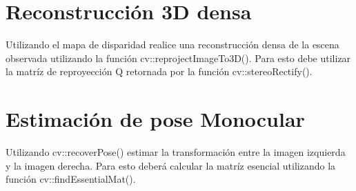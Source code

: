 \documentclass[tp]{lcc}
\begin{document}
\section{Reconstrucción 3D densa}
Utilizando el mapa de disparidad realice una reconstrucción densa de la escena observada utilizando la función cv::reprojectImageTo3D(). Para esto debe utilizar la matríz de reproyección Q retornada por la función cv::stereoRectify().

\section{Estimación de pose Monocular}
Utilizando cv::recoverPose() estimar la transformación entre la imagen izquierda y la imagen derecha. Para esto deberá calcular la matríz esencial utilizando la función cv::findEssentialMat().

\printbibliography
\end{document}
